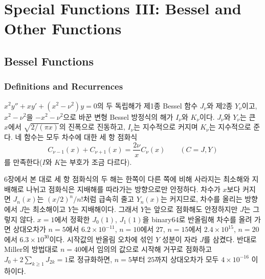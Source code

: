 \chapter{Special Functions III: Bessel and Other Functions}
\label{ch:special-3}


\section{Bessel Functions}
\label{sec:bessel}

\subsection{Definitions and Recurrences}

 $x^2y''+xy'+(x^2-\nu^2)y=0$의 두 독립해가 제1종 Bessel 함수 $J_\nu$와 제2종 $Y_\nu$이고, $x^2-\nu^2$을 $-x^2-\nu^2$으로 바꾼 변형 Bessel 방정식의 해가 $I_\nu$와 $K_\nu$이다\cite{watson1944bessel}. $J_\nu$와 $Y_\nu$는 큰 $x$에서 $\sqrt{2/(\pi x)}$의 진폭으로 진동하고, $I_\nu$는 지수적으로 커지며 $K_\nu$는 지수적으로 준다. 네 함수는 모두 차수에 대한 세 항 점화식
\[
C_{\nu-1}(x)+C_{\nu+1}(x)=\frac{2\nu}xC_\nu(x)\qquad(C=J,Y)
\]
를 만족한다($I$와 $K$는 부호가 조금 다르다).

6장에서 본 대로 세 항 점화식의 두 해는 한쪽이 다른 쪽에 비해 사라지는 최소해와 지배해로 나뉘고 점화식은 지배해를 따라가는 방향으로만 안정하다\cite{gautschi1967recurrence}. 차수가 $x$보다 커지면 $J_n(x)$는 $(x/2)^n/n!$처럼 급속히 줄고 $Y_n(x)$는 커지므로, 차수를 올리는 방향에서 $J$는 최소해이고 $Y$는 지배해이다. 그래서 $Y$는 앞으로 점화해도 안정하지만 $J$는 그렇지 않다. $x=1$에서 정확한 $J_0(1)$, $J_1(1)$을 binary64로 반올림해 차수를 올려 가면 상대오차가 $n=5$에서 $6.2\times10^{-11}$, $n=10$에서 $27$, $n=15$에서 $2.4\times10^{15}$, $n=20$에서 $6.3\times10^{30}$이다. 시작값의 반올림 오차에 섞인 $Y$ 성분이 자라 $J$를 삼켰다. 반대로 Miller의 방법대로 $n=40$에서 임의의 값으로 시작해 거꾸로 점화하고 $J_0+2\sum_{k\ge1}J_{2k}=1$로 정규화하면, $n=5$부터 $25$까지 상대오차가 모두 $4\times10^{-16}$ 이하이다.

